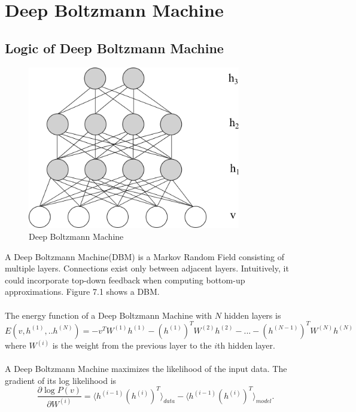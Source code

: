 \documentclass[12pt]{article}
\begin{document}
\section{Deep Boltzmann Machine}
\subsection{Logic of Deep Boltzmann Machine}
\begin{figure}[h]
\centering
\includegraphics[height=2.8in]{DBM.png}
\caption{Deep Boltzmann Machine} \label{fig:side:a}
\end{figure}
A Deep Boltzmann Machine(DBM) is a Markov Random Field consisting of multiple layers. Connections exist only between adjacent layers. Intuitively, it could incorporate top-down feedback when computing bottom-up approximations. Figure 7.1 shows a DBM.\\
\\
The energy function of a Deep Boltzmann Machine with $N$ hidden layers is\begin{equation}
E(v, h^{(1)},..h^{(N)})=-v^{T}W^{(1)}h^{(1)} -(h^{(1)})^TW^{(2)}h^{(2)}-...- (h^{(N-1)})^TW^{(N)}h^{(N)}
\end{equation}
where $W^{(i)}$ is the weight from the previous layer to the $i$th hidden layer.\\
\\
A Deep Boltzmann Machine maximizes the likelihood of the input data. The gradient of its log likelihood is \begin{equation}
\frac{\partial \log P(v)}{\partial W^{(i)}} = \langle h^{(i-1)}(h^{(i)})^T\rangle_{data} - \langle h^{(i-1)}(h^{(i)})^T\rangle_{model}.
\end{equation}
\end{document}
